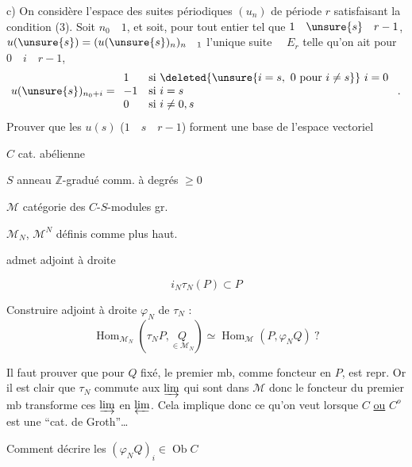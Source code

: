 c) On considère l'espace  des suites périodiques  $(u_n)$ de période $r$ satisfaisant la condition (3). Soit $n_0\quad1$, et soit, pour tout entier  tel que $1\quad\unsure{s}\quad r-1$, $u(\unsure{s})=(u(\unsure{s})_n)_{n\quad1}$ l'unique suite $\quad E_r$ telle qu'on ait
pour $0\quad i\quad r-1$,
\[
u(\unsure{s})_{n_0+i}=
\begin{array}{ll}
1&\text{si }\deleted{\unsure{i=s,\ 0\ \text{pour}\ i\ne s}}\ i=0\\
-1&\text{si }i=s\\
0&\text{si }i\ne0,s
\end{array}\ .
\]
Prouver que les $u(s)$ ($1\quad s\quad r-1$) forment une base de l'espace vectoriel


$C$ cat. abélienne

$S$ anneau $\mathbb Z$-gradué comm. à degrés $\geq0$

$\mathcal M$  catégorie des $C$-$S$-modules gr. \uline{}

$\mathcal M_N$, $\mathcal M^N$ définis comme plus haut.


admet  adjoint à droite

\[ i_N\tau_N(P)\subset P \]


Construire adjoint à droite $\varphi_N$ de $\tau_N$ :
\[
\operatorname{Hom}_{\mathcal M_N}(\tau_NP,\underset{\in\mathcal M_N}{Q})\simeq
\operatorname{Hom}_{\mathcal M}(P,\varphi_NQ)\ ?
\]

Il faut  prouver que pour $Q$ fixé, le premier mb, comme foncteur en $P$, est repr. Or il est clair que $\tau_N$ commute aux $\varinjlim$ qui sont  dans $\mathcal M$ donc le foncteur du premier mb transforme ces $\varinjlim$ en $\varprojlim$. Cela implique donc ce qu'on veut lorsque $C$ \uline{ou} $C^o$ est une ``cat. de Groth''\ldots

Comment  décrire les $(\varphi_NQ)_i\in\operatorname{Ob}C$

